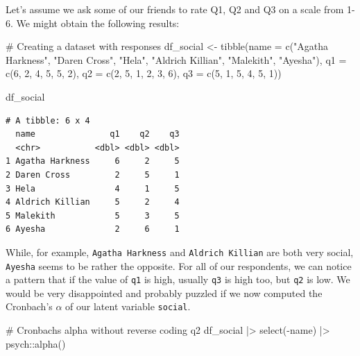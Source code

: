 \documentclass[
  letterpaper,
  DIV=11,
  numbers=noendperiod]{scrreprt}
\newenvironment{Shaded}{\begin{snugshade}}{\end{snugshade}}
\newcommand{\AttributeTok}[1]{\textcolor[rgb]{0.40,0.45,0.13}{#1}}
\newcommand{\CommentTok}[1]{\textcolor[rgb]{0.37,0.37,0.37}{#1}}
\newcommand{\DecValTok}[1]{\textcolor[rgb]{0.68,0.00,0.00}{#1}}
\newcommand{\FunctionTok}[1]{\textcolor[rgb]{0.28,0.35,0.67}{#1}}
\newcommand{\NormalTok}[1]{\textcolor[rgb]{0.00,0.23,0.31}{#1}}
\newcommand{\OtherTok}[1]{\textcolor[rgb]{0.00,0.23,0.31}{#1}}
\newcommand{\SpecialCharTok}[1]{\textcolor[rgb]{0.37,0.37,0.37}{#1}}
\newcommand{\StringTok}[1]{\textcolor[rgb]{0.13,0.47,0.30}{#1}}
\begin{document}
Let's assume we ask some of our friends to rate Q1, Q2 and Q3 on a scale
from 1-6. We might obtain the following results:

\begin{Shaded}
\begin{Highlighting}[]
\CommentTok{\# Creating a dataset with responses}
\NormalTok{df\_social }\OtherTok{\textless{}{-}} \FunctionTok{tibble}\NormalTok{(}\AttributeTok{name =} \FunctionTok{c}\NormalTok{(}\StringTok{"Agatha Harkness"}\NormalTok{, }\StringTok{"Daren Cross"}\NormalTok{,}
                             \StringTok{"Hela"}\NormalTok{, }\StringTok{"Aldrich Killian"}\NormalTok{,}
                             \StringTok{"Malekith"}\NormalTok{, }\StringTok{"Ayesha"}\NormalTok{),}
                    \AttributeTok{q1 =} \FunctionTok{c}\NormalTok{(}\DecValTok{6}\NormalTok{, }\DecValTok{2}\NormalTok{, }\DecValTok{4}\NormalTok{, }\DecValTok{5}\NormalTok{, }\DecValTok{5}\NormalTok{, }\DecValTok{2}\NormalTok{),}
                    \AttributeTok{q2 =} \FunctionTok{c}\NormalTok{(}\DecValTok{2}\NormalTok{, }\DecValTok{5}\NormalTok{, }\DecValTok{1}\NormalTok{, }\DecValTok{2}\NormalTok{, }\DecValTok{3}\NormalTok{, }\DecValTok{6}\NormalTok{),}
                    \AttributeTok{q3 =} \FunctionTok{c}\NormalTok{(}\DecValTok{5}\NormalTok{, }\DecValTok{1}\NormalTok{, }\DecValTok{5}\NormalTok{, }\DecValTok{4}\NormalTok{, }\DecValTok{5}\NormalTok{, }\DecValTok{1}\NormalTok{))}

\NormalTok{df\_social}
\end{Highlighting}
\end{Shaded}

\begin{verbatim}
# A tibble: 6 x 4
  name               q1    q2    q3
  <chr>           <dbl> <dbl> <dbl>
1 Agatha Harkness     6     2     5
2 Daren Cross         2     5     1
3 Hela                4     1     5
4 Aldrich Killian     5     2     4
5 Malekith            5     3     5
6 Ayesha              2     6     1
\end{verbatim}

While, for example, \texttt{Agatha\ Harkness} and
\texttt{Aldrich\ Killian} are both very social, \texttt{Ayesha} seems to
be rather the opposite. For all of our respondents, we can notice a
pattern that if the value of \texttt{q1} is high, usually \texttt{q3} is
high too, but \texttt{q2} is low. We would be very disappointed and
probably puzzled if we now computed the Cronbach's \(\alpha\) of our
latent variable \texttt{social}.

\begin{Shaded}
\begin{Highlighting}[]
\CommentTok{\# Cronbach\textquotesingle{}s alpha without reverse coding q2}
\NormalTok{df\_social }\SpecialCharTok{|\textgreater{}}
  \FunctionTok{select}\NormalTok{(}\SpecialCharTok{{-}}\NormalTok{name) }\SpecialCharTok{|\textgreater{}}
\NormalTok{  psych}\SpecialCharTok{::}\FunctionTok{alpha}\NormalTok{()}
\end{Highlighting}
\end{Shaded}
\end{document}
